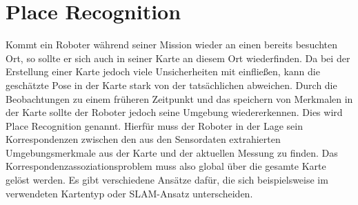 %
%
%
%
%
%		
%
%
%


\section[Place Recognition (Kopp)]{Place Recognition}


Kommt ein Roboter während seiner Mission wieder an einen bereits besuchten Ort, so sollte er sich auch in seiner Karte an diesem Ort wiederfinden. Da bei der Erstellung einer Karte jedoch viele Unsicherheiten mit einfließen, kann die geschätzte Pose in der Karte stark von der tatsächlichen abweichen. Durch die Beobachtungen zu einem früheren Zeitpunkt und das speichern von Merkmalen in der Karte sollte der Roboter jedoch seine Umgebung wiedererkennen. Dies wird Place Recognition genannt. Hierfür muss der Roboter in der Lage sein Korrespondenzen zwischen den aus den Sensordaten extrahierten Umgebungsmerkmale aus der Karte und der aktuellen Messung zu finden. Das Korrespondenzassoziationsproblem muss also global über die gesamte Karte gelöst werden. Es gibt verschiedene Ansätze dafür, die sich beispielsweise im verwendeten Kartentyp oder SLAM-Ansatz unterscheiden. 

